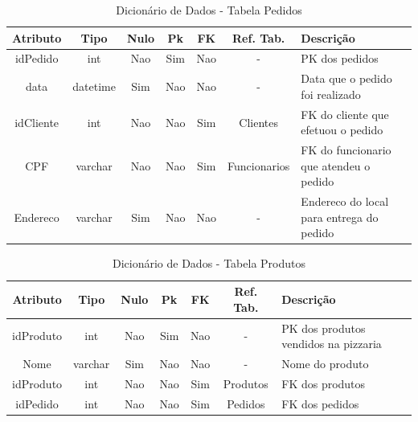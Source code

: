\documentclass[
	12pt,				%
	openright,			%
	oneside,			%
	a4paper,			%
	chapter=TITLE,		%
	section=TITLE,		%
	english,			%
	brazil				%
	]{abntex2}
\begin{document}
    \begin{table}[htbp]
    \centering
        \caption{Dicionário de Dados - Tabela Pedidos}
        \label{tb1_dicionario_dados_pedidos}
        \begin{tabular}{|c|c|c|c|c|c|p{3cm}|}
            \hline 
            \textbf{Atributo} & 
            \textbf{Tipo} & 
            \textbf{Nulo} & 
            \textbf{Pk} & 
            \textbf{FK} & 
            \textbf{Ref. Tab.} & 
            \textbf{Descrição} \\ \hline
            idPedido & int & Nao & Sim & Nao & - & PK dos pedidos \\ \hline
            data & datetime & Sim & Nao & Nao & - & Data que o pedido foi realizado \\ \hline
            idCliente & int & Nao & Nao & Sim & Clientes & FK do cliente que efetuou o pedido \\ \hline
            CPF & varchar & Nao & Nao & Sim & Funcionarios & FK do funcionario que atendeu o pedido \\ \hline
            Endereco & varchar & Sim & Nao & Nao & - & Endereco do local para entrega do pedido \\ \hline
        \end{tabular}
    \end{table}
    
    \begin{table}[htbp]
    \centering
        \caption{Dicionário de Dados - Tabela Produtos}
        \label{tb1_dicionario_dados_produtos}
        \begin{tabular}{|c|c|c|c|c|c|p{3cm}|}
        \hline
            \textbf{Atributo} & 
            \textbf{Tipo} & 
            \textbf{Nulo} & 
            \textbf{Pk} & 
            \textbf{FK} & 
            \textbf{Ref. Tab.} & 
            \textbf{Descrição} \\ \hline
            idProduto & int & Nao & Sim & Nao & - & PK dos produtos vendidos na pizzaria \\ \hline
            Nome & varchar & Sim & Nao & Nao & - & Nome do produto \\ \hline
            idProduto & int & Nao & Nao & Sim & Produtos & FK dos produtos \\ \hline
            idPedido & int & Nao & Nao & Sim & Pedidos & FK dos pedidos \\ \hline
        \end{tabular}
    \end{table}
    
\end{document}
